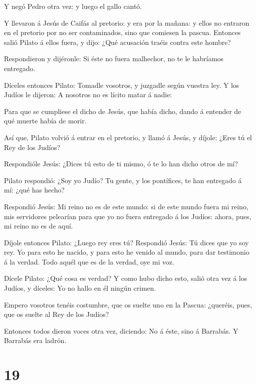  Y negó Pedro otra vez: y luego el gallo cantó.

 Y llevaron á Jesús de Caifás al pretorio: y era por la
mañana: y ellos no entraron en el pretorio por no ser contaminados, sino
que comiesen la pascua.  Entonces salió Pilato á ellos
fuera, y dijo: ¿Qué acusación traéis contra este hombre?

 Respondieron y dijéronle: Si éste no fuera malhechor, no
te le habríamos entregado.

 Díceles entonces Pilato: Tomadle vosotros, y juzgadle
según vuestra ley. Y los Judíos le dijeron: A nosotros no es lícito
matar á nadie:

 Para que se cumpliese el dicho de Jesús, que había dicho,
dando á entender de qué muerte había de morir.

 Así que, Pilato volvió á entrar en el pretorio, y llamó á
Jesús, y díjole: ¿Eres tú el Rey de los Judíos?

 Respondióle Jesús: ¿Dices tú esto de ti mismo, ó te lo han
dicho otros de mí?

 Pilato respondió: ¿Soy yo Judío? Tu gente, y los
pontífices, te han entregado á mí: ¿qué has hecho?

 Respondió Jesús: Mi reino no es de este mundo: si de este
mundo fuera mi reino, mis servidores pelearían para que yo no fuera
entregado á los Judíos: ahora, pues, mi reino no es de aquí.

 Díjole entonces Pilato: ¿Luego rey eres tú? Respondió
Jesús: Tú dices que yo soy rey. Yo para esto he nacido, y para esto he
venido al mundo, para dar testimonio á la verdad. Todo aquél que es de
la verdad, oye mi voz.

 Dícele Pilato: ¿Qué cosa es verdad? Y como hubo dicho
esto, salió otra vez á los Judíos, y díceles: Yo no hallo en él ningún
crimen.

 Empero vosotros tenéis costumbre, que os suelte uno en la
Pascua: ¿queréis, pues, que os suelte al Rey de los Judíos?

 Entonces todos dieron voces otra vez, diciendo: No á éste,
sino á Barrabás. Y Barrabás era ladrón.

\hypertarget{section-18}{%
\section{19}\label{section-18}}

